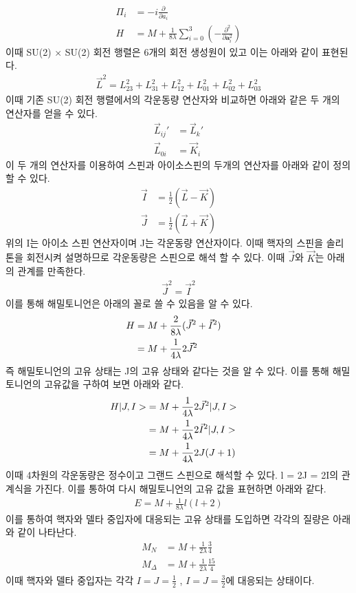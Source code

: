 \documentclass[superscriptaddress,
nofootinbib,byrevtex,fleqn,prd,12pt]{revtex4}
\begin{document}
 \begin{align}
   \Pi_{i} &= -i \frac{\partial} {\partial a_{i}} \\
   H & = M + \frac{1}{8 \lambda} \sum_{i=0}^{3} \left(- \frac{\partial ^{2}}{\partial \mathbf{a}_{i}^{2}}\right)
 \end{align}
 이때 SU(2) $\times$ SU(2) 회전 행렬은 6개의 회전 생성원이 있고 이는 아래와 같이 표현된다.
\begin{align}
   \vec{L}^{2} = L_{23}^{2} + L_{31}^{2}+L_{12}^{2}+L_{01}^{2}+L_{02}^{2}+L_{03}^{2}
\end{align}
이때 기존 SU(2) 회전 행렬에서의 각운동량 연산자와 비교하면 아래와 같은 두 개의 연산자를 얻을 수 있다.
\begin{align}
  \vec{L}_{ij}'&=\vec{L}_{k}'\\
  \vec{L}_{0i} &=\vec{K}_{i}
\end{align}
이 두 개의 연산자를 이용하여 스핀과 아이소스핀의 두개의 연산자를 아래와 같이 정의할 수 있다.
\begin{align}
  \vec{I} &= \frac{1}{2}(\vec{L}- \vec{K}) \\
  \vec{J} &= \frac{1}{2}(\vec{L}+ \vec{K})
\end{align}
위의 I는 아이소 스핀 연산자이며 J는 각운동량 연산자이다. 이때 핵자의 스핀을 솔리톤을 회전시켜 설명하므로 각운동량은 스핀으로 해석 할 수 있다. 이때 $ \vec{J}$와 $ \vec{K}$는 아래의 관계를 만족한다.
\begin{align}
  \vec{J}^{2} = \vec{I}^{2}
\end{align}
이를 통해 해밀토니언은 아래의 꼴로 쓸 수 있음을 알 수 있다.
 \begin{align}
   H &= M +\frac{2}{8\lambda}(\vec{J}^{2}+\vec{I}^{2}) \cr
    &= M +\frac{1}{4\lambda} 2 \vec{J}^{2}
 \end{align}
즉 해밀토니언의 고유 상태는 J의 고유 상태와 같다는 것을 알 수 있다. 이를 통해 해밀토니언의 고유값을 구하여 보면 아래와 같다.
\begin{align}
  H|J,I> &= M +\frac{1}{4\lambda} 2 \vec{J}^{2}|J,I> \cr
  &= M +\frac{1}{4\lambda} 2 \vec{I}^{2}|J,I> \cr
  &= M +\frac{1}{4\lambda} 2J(J+1)
\end{align}
이때 4차원의 각운동량은 정수이고 그랜드 스핀으로 해석할 수 있다. l = 2J = 2I의 관계식을 가진다. 이를 통하여 다시 해밀토니언의 고유 값을 표현하면 아래와 같다.
\begin{align}
  E = M + \frac{1}{8\lambda}l(l+2)
\end{align}
이를 통하여 핵자와 델타 중입자에 대응되는 고유 상태를 도입하면 각각의 질량은 아래와 같이 나타난다.
\begin{align}
  M_{N} &= M + \frac{1}{2\lambda}\frac{3}{4} \\
  M_{\Delta} &= M + \frac{1}{2\lambda}\frac{15}{4}
\end{align}
이때 핵자와 델타 중입자는 각각 $ I=J= \frac{1}{2} $ , $ I= J= \frac{3}{2} $에 대응되는 상태이다.
\end{document}

